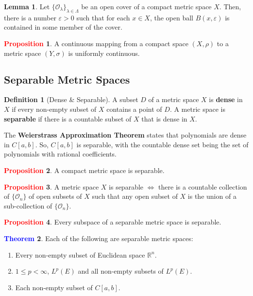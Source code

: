 \documentclass[11pt]{article}
\newcommand{\open}[0]{\mathcal{O}}
\theoremstyle{definition}
\theoremstyle{definition}
\newcommand{\R}[0]{\mathbb{R}}
\newtheorem{theorem}{\textcolor{blue}{Theorem}}
\newtheorem{lemma}[theorem]{Lemma}
\theoremstyle{definition}
\newtheorem{definition}{\textcolor{OliveGreen}{Definition}}
\newtheorem{prop}{\textcolor{red}{Proposition}}
\theoremstyle{remark}
\begin{document}
\begin{lemma}
	Let $\{ \open_\lambda \}_{\lambda \in \Lambda}$ be an open cover of a compact metric space $X$. Then, there is a number $\varepsilon > 0$ such that for each $x \in X$, the open ball $B(x, \varepsilon) $ is contained in some member of the cover. 
\end{lemma}

\begin{prop}
	A continuous mapping from a compact space $(X, \rho)$ to a metric space $(Y, \sigma)$ is uniformly continuous. 
\end{prop}

\subsection{Separable Metric Spaces}

\begin{definition}[Dense \& Separable] A subset $D $ of a metric space $X$ is \textbf{dense} in $X$ if every non-empty subset of $X$ contains a point of $D$. A metric space is \textbf{separable} if there is a countable subset of $X$ that is dense in $X$. 	
\end{definition}

The \textbf{Weierstrass Approximation Theorem} states that polynomials are dense in $C[a,b]$. So, $C[a,b]$ is separable, with the countable dense set being the set of polynomials with rational coefficients. 

\begin{prop}
	A compact metric space is separable. 
\end{prop}

\begin{prop}
	A metric space $X$ is separable $\iff$ there is a countable collection of $\{ \open_n \}$ of open subsets of $X$ such that any open subset of $X$ is the union of a sub-collection of $\{ \open_n \}$. 
\end{prop}

\begin{prop}
	Every subspace of a separable metric space is separable. 
\end{prop}

\begin{theorem}
	Each of the following are separable metric spaces: 
	\begin{enumerate}[noitemsep]
		\item Every non-empty subset of Euclidean space $\R^n$. 
		\item $1 \leq p < \infty$, $L^p(E)$ and all non-empty subsets of $L^p(E)$. 
		\item Each non-empty subset of $C[a,b]$. 
	\end{enumerate}
\end{theorem}
\end{document}
